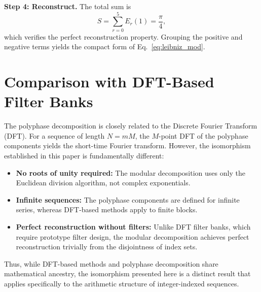 \documentclass[12pt,a4paper]{article}
\theoremstyle{plain}
\theoremstyle{definition}
\theoremstyle{remark}
\begin{document}
\textbf{Step 4: Reconstruct.} The total sum is
\[
S = \sum_{r=0}^{5} E_r(1) = \frac{\pi}{4},
\]
which verifies the perfect reconstruction property. Grouping the positive and negative terms yields the compact form of Eq.~\eqref{eq:leibniz_mod}.

\section{Comparison with DFT-Based Filter Banks}
\label{app:DFT}

The polyphase decomposition is closely related to the Discrete Fourier Transform (DFT). For a sequence of length \(N = mM\), the \(M\)-point DFT of the polyphase components yields the short-time Fourier transform. However, the isomorphism established in this paper is fundamentally different:

\begin{itemize}
    \item \textbf{No roots of unity required:} The modular decomposition uses only the Euclidean division algorithm, not complex exponentials.
    \item \textbf{Infinite sequences:} The polyphase components are defined for infinite series, whereas DFT-based methods apply to finite blocks.
    \item \textbf{Perfect reconstruction without filters:} Unlike DFT filter banks, which require prototype filter design, the modular decomposition achieves perfect reconstruction trivially from the disjointness of index sets.
\end{itemize}

Thus, while DFT-based methods and polyphase decomposition share mathematical ancestry, the isomorphism presented here is a distinct result that applies specifically to the arithmetic structure of integer-indexed sequences.
\end{document}
